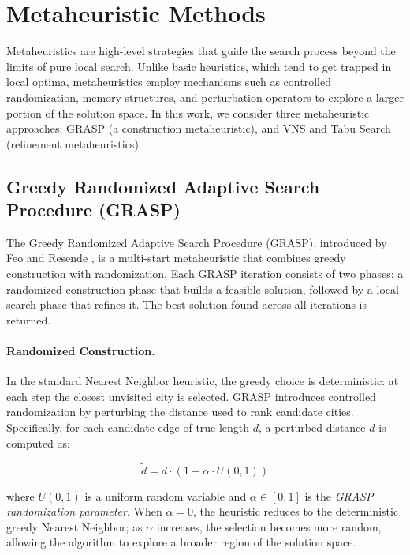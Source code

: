 \documentclass{article}
\begin{document}
\section{Metaheuristic Methods}

Metaheuristics are high-level strategies that guide the search process beyond the limits
of pure local search. Unlike basic heuristics, which tend to get trapped in local optima,
metaheuristics employ mechanisms such as controlled randomization, memory structures, and
perturbation operators to explore a larger portion of the solution space. In this work, we
consider three metaheuristic approaches: GRASP (a construction metaheuristic), and VNS and
Tabu Search (refinement metaheuristics).

\subsection{Greedy Randomized Adaptive Search Procedure (GRASP)}

The Greedy Randomized Adaptive Search Procedure (GRASP), introduced by Feo and Resende
\cite{feo1995greedy}, is a multi-start metaheuristic that combines greedy construction with
randomization. Each GRASP iteration consists of two phases: a randomized construction phase
that builds a feasible solution, followed by a local search phase that refines it. The best
solution found across all iterations is returned.

\paragraph{Randomized Construction.}
In the standard Nearest Neighbor heuristic, the greedy choice is deterministic: at each step
the closest unvisited city is selected. GRASP introduces controlled randomization by
perturbing the distance used to rank candidate cities. Specifically, for each candidate edge
of true length $d$, a perturbed distance $\tilde{d}$ is computed as:

\[
\tilde{d} = d \cdot \left(1 + \alpha \cdot U(0,1) \right)
\]

where $U(0,1)$ is a uniform random variable and $\alpha \in [0, 1]$ is the \textit{GRASP
randomization parameter}. When $\alpha = 0$, the heuristic reduces to the deterministic
greedy Nearest Neighbor; as $\alpha$ increases, the selection becomes more random, allowing
the algorithm to explore a broader region of the solution space.
\end{document}
